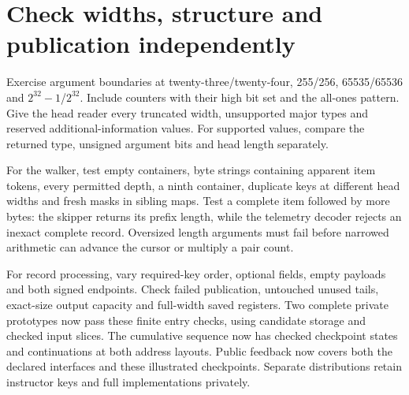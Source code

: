 \section{Check widths, structure and publication independently}
Exercise argument boundaries at twenty-three/twenty-four, 255/256, 65535/65536 and
$2^{32}-1$/$2^{32}$. Include counters with their high bit set and the all-ones pattern.
Give the head reader every truncated width, unsupported major types and reserved
additional-information values. For supported values, compare the returned type,
unsigned argument bits and head length separately.

For the walker, test empty containers, byte strings containing apparent item tokens,
every permitted depth, a ninth container, duplicate keys at different head widths and
fresh masks in sibling maps. Test a complete item followed by more bytes: the skipper
returns its prefix length, while the telemetry decoder rejects an inexact complete
record. Oversized length arguments must fail before narrowed arithmetic can advance
the cursor or multiply a pair count.

For record processing, vary required-key order, optional fields, empty payloads and
both signed endpoints. Check failed publication, untouched unused tails, exact-size
output capacity and full-width saved registers. Two complete private prototypes now pass these finite entry checks, using candidate
storage and checked input slices. The cumulative sequence now has checked checkpoint states and continuations at both
address layouts. Public feedback now covers both the declared interfaces and these illustrated
checkpoints. Separate distributions retain instructor keys and full implementations
privately.
